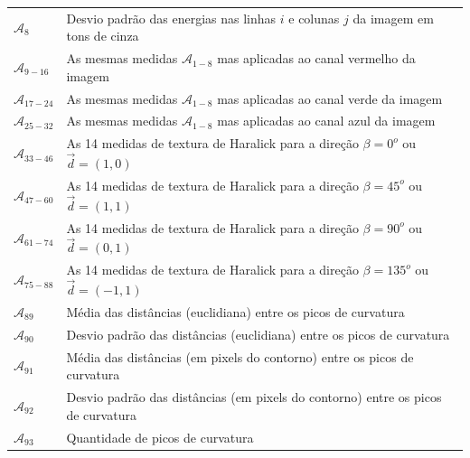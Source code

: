 \begin{table}
\begin{center}
\begin{tabular}{l|l}
    $\mathcal{A}_8$ &
    Desvio padrão das energias nas linhas $i$ e colunas $j$ da imagem em tons de
    cinza \\

    $\mathcal{A}_{9-16}$ &
    As mesmas medidas $\mathcal{A}_{1-8}$ mas aplicadas ao canal vermelho da
    imagem \\

    $\mathcal{A}_{17-24}$ &
    As mesmas medidas $\mathcal{A}_{1-8}$ mas aplicadas ao canal verde da
    imagem \\

    $\mathcal{A}_{25-32}$ &
    As mesmas medidas $\mathcal{A}_{1-8}$ mas aplicadas ao canal azul da
    imagem \\

    $\mathcal{A}_{33-46}$ &
    As 14 medidas de textura de Haralick para a direção $\beta = 0^o$ ou $\vec{d} = (1, 0)$ \\

$\mathcal{A}_{47-60}$ &
    As 14 medidas de textura de Haralick para a direção $\beta = 45^o$ ou $\vec{d} = (1, 1)$ \\

$\mathcal{A}_{61-74}$ &
    As 14 medidas de textura de Haralick para a direção $\beta = 90^o$ ou $\vec{d} = (0, 1)$ \\

$\mathcal{A}_{75-88}$ &
    As 14 medidas de textura de Haralick para a direção $\beta = 135^o$ ou $\vec{d} = (-1, 1)$ \\

    $\mathcal{A}_{89}$ &
    Média das distâncias (euclidiana) entre os picos de curvatura \\

    $\mathcal{A}_{90}$ &
    Desvio padrão das distâncias (euclidiana) entre os picos de curvatura \\

    $\mathcal{A}_{91}$ &
    Média das distâncias (em pixels do contorno) entre os picos de curvatura \\

    $\mathcal{A}_{92}$ &
    Desvio padrão das distâncias (em pixels do contorno) entre os picos de
    curvatura \\

    $\mathcal{A}_{93}$ &
    Quantidade de picos de curvatura \\


\end{tabular}
\end{center}
\end{table}

